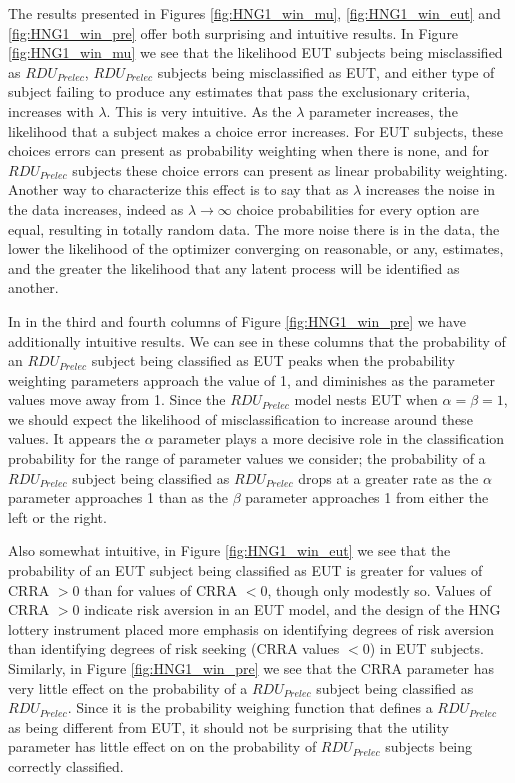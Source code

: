 \documentclass[../main.tex]{subfiles}
\begin{document}
The results presented in Figures \ref{fig:HNG1_win_mu}, \ref{fig:HNG1_win_eut} and \ref{fig:HNG1_win_pre} offer both surprising and intuitive results.
In Figure \ref{fig:HNG1_win_mu} we see that the likelihood EUT subjects being misclassified as $\mathit{RDU_{Prelec}}$, $\mathit{RDU_{Prelec}}$ subjects being misclassified as EUT, and either type of subject failing to produce any estimates that pass the exclusionary criteria, increases with $\lambda$.
This is very intuitive. 
As the $\lambda$ parameter increases, the likelihood that a subject makes a choice error increases.
For EUT subjects, these choices errors can present as probability weighting when there is none, and for $\mathit{RDU_{Prelec}}$ subjects these choice errors can present as linear probability weighting.
Another way to characterize this effect is to say that as $\lambda$ increases the noise in the data increases, indeed as $\lambda \to \infty$ choice probabilities for every option are equal, resulting in totally random data.
The more noise there is in the data, the lower the likelihood of the optimizer converging on reasonable, or any, estimates, and the greater the likelihood that any latent process will be identified as another.

In in the third and fourth columns of Figure \ref{fig:HNG1_win_pre} we have additionally intuitive results.
We can see in these columns that the probability of an $\mathit{RDU_{Prelec}}$ subject being classified as EUT peaks when the probability weighting parameters approach the value of 1, and diminishes as the parameter values move away from 1.
Since the $\mathit{RDU_{Prelec}}$ model nests EUT when $\alpha = \beta = 1$, we should expect the likelihood of misclassification to increase around these values.
It appears the $\alpha$ parameter plays a more decisive role in the classification probability for the range of parameter values we consider; the probability of a $\mathit{RDU_{Prelec}}$ subject being classified as $\mathit{RDU_{Prelec}}$ drops at a greater rate as the $\alpha$ parameter approaches 1 than as the $\beta$ parameter approaches 1 from either the left or the right.

Also somewhat intuitive, in Figure \ref{fig:HNG1_win_eut} we see that the probability of an EUT subject being classified as EUT is greater for values of CRRA $> 0$ than for values of CRRA $< 0$, though only modestly so.
Values of CRRA $> 0$ indicate risk aversion in an EUT model, and the design of the HNG lottery instrument placed more emphasis on identifying degrees of risk aversion than identifying degrees of risk seeking (CRRA values $ < 0$) in EUT subjects.
Similarly, in Figure \ref{fig:HNG1_win_pre} we see that the CRRA parameter has very little effect on the probability of a $\mathit{RDU_{Prelec}}$ subject being classified as $\mathit{RDU_{Prelec}}$.
Since it is the probability weighing function that defines a $\mathit{RDU_{Prelec}}$ as being different from EUT, it should not be surprising that the utility parameter has little effect on on the probability of $\mathit{RDU_{Prelec}}$ subjects being correctly classified.
\end{document}
